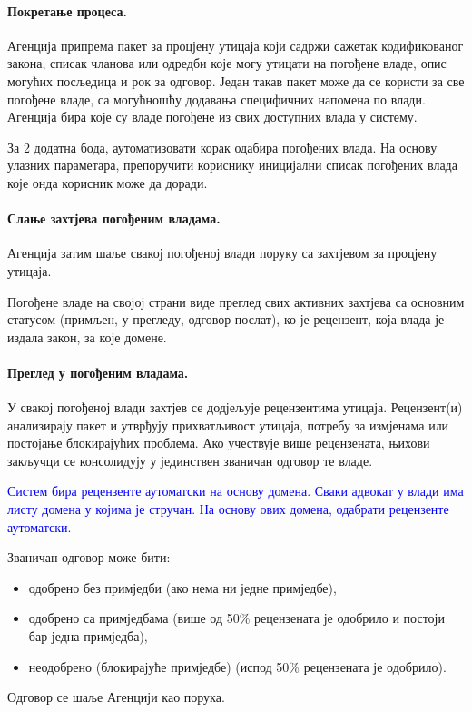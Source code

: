 \documentclass[12pt,a4paper]{article}
\newcommand{\optional}[1]{\textcolor{blue}{#1}}
\newcommand{\bonus}[1]{\textcolor{emerald}{#1}}
\begin{document}
\paragraph{Покретање процеса.}

Агенција припрема пакет за процјену утицаја који садржи сажетак кодификованог закона, списак чланова или одредби које могу утицати на погођене владе, опис могућих посљедица и рок за одговор. Један такав пакет може да се користи за све погођене владе, са могућношћу додавања специфичних напомена по влади. Агенција бира које су владе погођене из свих доступних влада у систему.

\bonus{За 2 додатна бода, аутоматизовати корак одабира погођених влада. На основу улазних параметара, препоручити кориснику иницијални списак погођених влада које онда корисник може да доради.}

\paragraph{Слање захтјева погођеним владама.}

Агенција затим шаље свакој погођеној влади поруку са захтјевом за процјену утицаја.

\bonus{Погођене владе на својој страни виде преглед свих активних захтјева са основним статусом (примљен, у прегледу, одговор послат), ко је рецензент, која влада је издала закон, за које домене.}

\paragraph{Преглед у погођеним владама.}

У свакој погођеној влади захтјев се додјељује рецензентима утицаја. Рецензент(и) анализирају пакет и утврђују прихватљивост утицаја, потребу за измјенама или постојање блокирајућих проблема. Ако учествује више рецензената, њихови закључци се консолидују у јединствен званичан одговор те владе.

\optional{Систем бира рецензенте аутоматски на основу домена. Сваки адвокат у влади има листу домена у којима је стручан. На основу ових домена, одабрати рецензенте аутоматски.}

Званичан одговор може бити:
\begin{itemize}
    \item одобрено без примједби (ако нема ни једне примједбе),
    \item одобрено са примједбама (више од 50\% рецензената је одобрило и постоји бар једна примједба),
    \item неодобрено (блокирајуће примједбе) (испод 50\% рецензената је одобрило).
\end{itemize}
Одговор се шаље Агенцији као порука.
\end{document}
